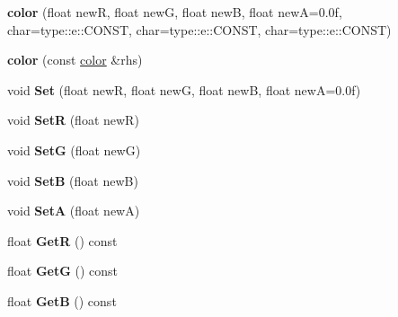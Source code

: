 \begin{DoxyCompactItemize}
\item 
\hypertarget{classmath_1_1color_a2c6b7b3ae532f3708d0a6aa131e1d714}{
{\bfseries color} (float newR, float newG, float newB, float newA=0.0f, char=type::e::CONST, char=type::e::CONST, char=type::e::CONST)}
\label{classmath_1_1color_a2c6b7b3ae532f3708d0a6aa131e1d714}

\item 
\hypertarget{classmath_1_1color_aae83453b94bb835282a68104a3e90cbc}{
{\bfseries color} (const \hyperlink{classmath_1_1color}{color} \&rhs)}
\label{classmath_1_1color_aae83453b94bb835282a68104a3e90cbc}

\item 
\hypertarget{classmath_1_1color_a999bd6c71eec01eea4e0e5720e5a7a21}{
void {\bfseries Set} (float newR, float newG, float newB, float newA=0.0f)}
\label{classmath_1_1color_a999bd6c71eec01eea4e0e5720e5a7a21}

\item 
\hypertarget{classmath_1_1color_aafd7625cb36782c1c821234786e8d841}{
void {\bfseries SetR} (float newR)}
\label{classmath_1_1color_aafd7625cb36782c1c821234786e8d841}

\item 
\hypertarget{classmath_1_1color_af6dc67f762cbd2e6a3cbc807ae04edcd}{
void {\bfseries SetG} (float newG)}
\label{classmath_1_1color_af6dc67f762cbd2e6a3cbc807ae04edcd}

\item 
\hypertarget{classmath_1_1color_a41635c6255bd8fc5c3b83e818fafe7ed}{
void {\bfseries SetB} (float newB)}
\label{classmath_1_1color_a41635c6255bd8fc5c3b83e818fafe7ed}

\item 
\hypertarget{classmath_1_1color_a450632d6fa5650c80f2e476d15587860}{
void {\bfseries SetA} (float newA)}
\label{classmath_1_1color_a450632d6fa5650c80f2e476d15587860}

\item 
\hypertarget{classmath_1_1color_a864e102922c93ba5062fe219092ff493}{
float {\bfseries GetR} () const }
\label{classmath_1_1color_a864e102922c93ba5062fe219092ff493}

\item 
\hypertarget{classmath_1_1color_a04edc085b4fb33fc0707af0803542835}{
float {\bfseries GetG} () const }
\label{classmath_1_1color_a04edc085b4fb33fc0707af0803542835}

\item 
\hypertarget{classmath_1_1color_a34d60b307200ba4eb98580d0f3c76514}{
float {\bfseries GetB} () const }
\label{classmath_1_1color_a34d60b307200ba4eb98580d0f3c76514}


\end{DoxyCompactItemize}
